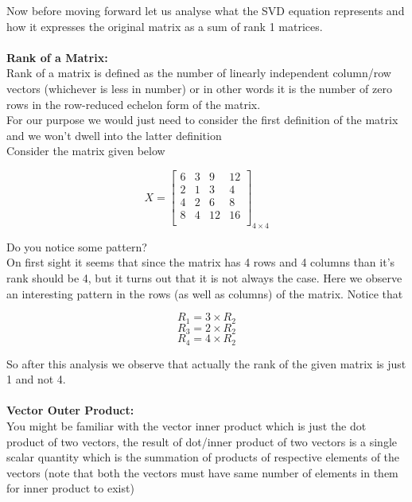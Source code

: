 \documentclass{article}
\begin{document}
Now before moving forward let us analyse what the SVD equation represents and how it expresses the original matrix as a sum of rank 1 matrices.\\ \\

\textbf{Rank of a Matrix:} \\
Rank of a matrix is defined as the number of linearly independent column/row vectors (whichever is less in number) or in other words it is the number of zero rows in the row-reduced echelon form of the matrix. \\
For our purpose we would just need to consider the first definition of the matrix and we won't dwell into the latter definition \\
Consider the matrix given below

\begin{equation*}
    X = \begin{bmatrix}
        6 & 3 & 9 & 12 \\
        2 & 1 & 3 & 4 \\
        4 & 2 & 6 & 8 \\
        8 & 4 & 12 & 16 \\
    \end{bmatrix}_{4\times4}
\end{equation*}

Do you notice some pattern? \\
On first sight it seems that since the matrix has 4 rows and 4 columns than it's rank should be 4, but it turns out that it is not always the case. Here we observe an interesting pattern in the rows (as well as columns) of the matrix. Notice that

\begin{equation}
    R_{1} = 3 \times R_{2}
\end{equation}
\begin{equation}
    R_{3} = 2 \times R_{2}
\end{equation}
\begin{equation}
    R_{4} = 4 \times R_{2}
\end{equation}

So after this analysis we observe that actually the rank of the given matrix is just 1 and not 4. \\ \\

\textbf{Vector Outer Product:} \\
You might be familiar with the vector inner product which is just the dot product of two vectors, the result of dot/inner product of two vectors is a single scalar quantity which is the summation of products of respective elements of the vectors (note that both the vectors must have same number of elements in them for inner product to exist) \\
\end{document}
